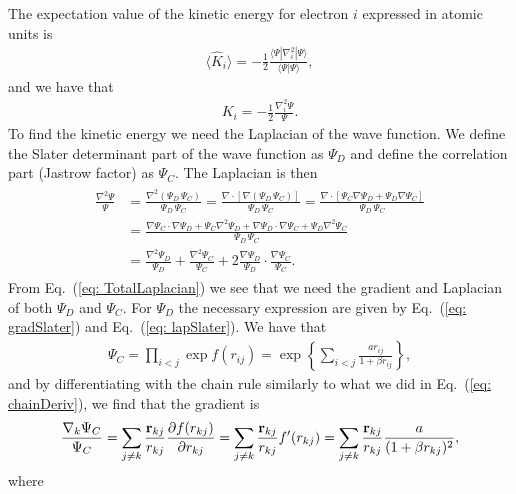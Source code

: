 \documentclass[../main.tex]{subfiles}
\begin{document}
\begin{appendices}
The expectation value of the kinetic energy for electron $i$ expressed in atomic units is 
\begin{align}
    \langle \hat{K}_i \rangle = -\frac{1}{2}\frac{\langle\Psi|\nabla_{i}^2|\Psi \rangle}{\langle\Psi|\Psi \rangle}, 
\end{align}
and we have that 
\begin{align}
    K_i = -\frac{1}{2}\frac{\nabla_{i}^{2} \Psi}{\Psi}.
\end{align}
To find the kinetic energy we need the Laplacian of the wave function. We define the Slater determinant part of the wave function as $\Psi_D$ and define the correlation part (Jastrow factor) as $\Psi_C$. The Laplacian is then 
\begin{align}\label{eq: TotalLaplacian}
\begin{split}
    \frac{\nabla^2 \Psi}{\Psi} & =  \frac{\nabla^2 ({\Psi_{D} \,  \Psi_C})}{\Psi_{D} \,  \Psi_C} = \frac{\nabla  \cdot [\nabla  {(\Psi_{D} \,  \Psi_C)}]}{\Psi_{D} \,  \Psi_C} = \frac{\nabla  \cdot [ \Psi_C \nabla  \Psi_{D} + \Psi_{D} \nabla   \Psi_C]}{\Psi_{D} \,  \Psi_C}\\
    &  =  \frac{\nabla   \Psi_C \cdot \nabla  \Psi_{D} +  \Psi_C \nabla^2 \Psi_{D} + \nabla  \Psi_{D} \cdot \nabla   \Psi_C + \Psi_{D} \nabla^2  \Psi_C}{\Psi_{D} \,  \Psi_C}\\
    & =  \frac{\nabla^2 \Psi_{D}}{\Psi_{D}} + \frac{\nabla^2  \Psi_C}{ \Psi_C} + 2 \frac{\nabla  \Psi_{D}}{\Psi_{D}}\cdot\frac{\nabla   \Psi_C}{ \Psi_C}.
\end{split}
\end{align}
From Eq.~(\ref{eq: TotalLaplacian}) we see that we need the gradient and Laplacian of both $\Psi_D$ and $\Psi_C$. For $\Psi_D$ the necessary expression are given by Eq.~(\ref{eq: gradSlater}) and Eq.~(\ref{eq: lapSlater}). We have that 
\begin{align}
    \Psi_{C}=\prod_{i< j}\exp{f(r_{ij})}= \exp{\left\{\sum_{i<j}\frac{ar_{ij}}{1+\beta r_{ij}}\right\}},
\end{align}
and by differentiating with the chain rule similarly to what we did in Eq.~(\ref{eq: chainDeriv}), we find that the gradient is 
\begin{align}
    \frac{ \nabla_k \Psi_C}{ \Psi_C }= \sum_{j\ne k}\frac{{\bf r}_{kj}}{r_{kj}} \frac{\partial f(r_{kj})}{\partial r_{kj}} = \sum_{j\ne k}\frac{{\bf r}_{kj}}{r_{kj}} f'(r_{kj}) = \sum_{j\ne k}\frac{{\bf r}_{kj}}{r_{kj}}\frac{a}{(1+\beta r_{kj})^2},
\end{align}
where 
\begin{align}

\end{align}
\end{appendices}
\end{document}

